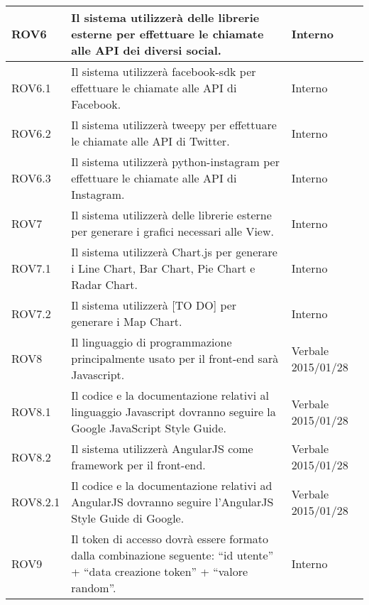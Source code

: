 \begin{center}
\begin{longtable}{| p{2.5cm} | p{8cm} | p{2cm} |}
		ROV6  &  Il sistema utilizzerà delle librerie esterne per effettuare le chiamate alle API dei diversi social.  &  Interno \\
		\hline
		ROV6.1  &  Il sistema utilizzerà facebook-sdk per effettuare le chiamate alle API di Facebook.  &  Interno \\
		\hline
		ROV6.2  &  Il sistema utilizzerà tweepy per effettuare le chiamate alle API di Twitter.  &  Interno \\
		\hline
		ROV6.3  &  Il sistema utilizzerà python-instagram per effettuare le chiamate alle API di Instagram.  &  Interno \\
		\hline

		ROV7  &  Il sistema utilizzerà delle librerie esterne per generare i grafici necessari alle View.  &  Interno \\
		\hline
		ROV7.1  &  Il sistema utilizzerà Chart.js per generare i Line Chart, Bar Chart, Pie Chart e Radar Chart.  &  Interno \\
		\hline
		ROV7.2  &  Il sistema utilizzerà [TO DO] per generare i Map Chart.  &  Interno \\
		\hline

		ROV8  &  Il linguaggio di programmazione principalmente usato per il front-end sarà Javascript.  &  Verbale 2015/01/28 \\
		\hline
		ROV8.1 & Il codice e la documentazione relativi al linguaggio Javascript dovranno seguire la Google JavaScript Style Guide. & Verbale 2015/01/28 \\
		\hline
		ROV8.2  &  Il sistema utilizzerà AngularJS come framework per il front-end.  &  Verbale 2015/01/28 \\
		\hline
		ROV8.2.1 & Il codice e la documentazione relativi ad AngularJS dovranno seguire l'AngularJS Style Guide di Google. & Verbale 2015/01/28 \\

		ROV9  &  Il token di accesso dovrà essere formato dalla combinazione seguente: ``id utente'' + ``data creazione token'' + ``valore random''.  &  Interno \\
		\hline

	\end{longtable}
	\egroup
\end{center}
